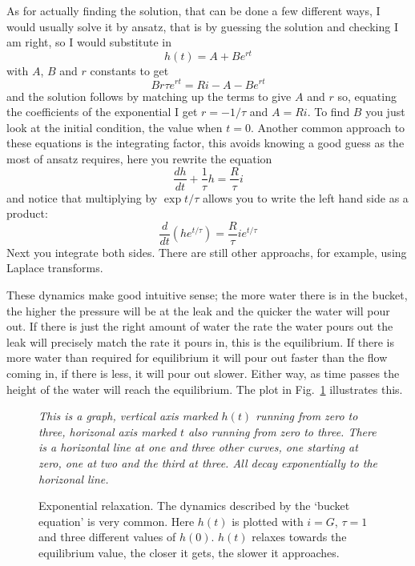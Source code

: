 \documentclass[12pt]{article}
\begin{document}
As for actually finding the solution, that can be
done a few different ways, I would usually solve it by ansatz, that is
by guessing the solution and checking I am right, so I would
substitute in
\begin{equation}
  h(t)=A+Be^{rt}
\end{equation}
with $A$, $B$ and $r$ constants to get
\begin{equation}
  Br\tau e^{rt}=Ri-A-Be^{rt}
\end{equation}
and the solution follows by matching up the terms to give $A$ and $r$
so, equating the coefficients of the exponential I get $r=-1/\tau$ and
$A=Ri$. To find $B$ you just look at the initial condition, the value
when $t=0$. Another common approach to these equations is the
integrating factor, this avoids knowing a good guess as the most of
ansatz requires, here you rewrite the equation
\begin{equation}
  \frac{dh}{dt}+\frac{1}{\tau}h=\frac{R}{\tau}i
\end{equation}
and notice that multiplying by $\exp{t/\tau}$ allows you to write the
left hand side as a product:
\begin{equation}
  \frac{d}{dt}\left(he^{t/\tau}\right)=\frac{R}{\tau}ie^{t/\tau}
\end{equation}
Next you integrate both sides. There are still other approachs, for
example, using Laplace transforms.

These dynamics make good intuitive sense; the more water there is in
the bucket, the higher the pressure will be at the leak and the
quicker the water will pour out. If there is just the right amount of
water the rate the water pours out the leak will precisely match the
rate it pours in, this is the equilibrium. If there is more water than
required for equilibrium it will pour out faster than the flow coming
in, if there is less, it will pour out slower. Either way, as time
passes the height of the water will reach the equilibrium. The plot in
Fig.~\ref{bucket_v} illustrates this.

\begin{figure}
    {\textsl{This is a graph, vertical
      axis marked $h(t)$ running from zero to three, horizonal axis
      marked $t$ also running from zero to three. There is a
      horizontal line at one and three other curves, one starting at zero, one at two and the third at three. All decay exponentially to the horizonal line. }}
    {
  \begin{center}
    
\end{center}
    }
\caption{Exponential relaxation. The dynamics described by the
  \lq{}bucket equation\rq{} is very common. Here
  $h(t)$ is plotted with
  $i=G$, $\tau=1$ and three different values of
  $h(0)$. $h(t)$ relaxes towards the equilibrium value, the closer it gets, the slower it approaches.\label{bucket_v}}
\end{figure}
\end{document}
